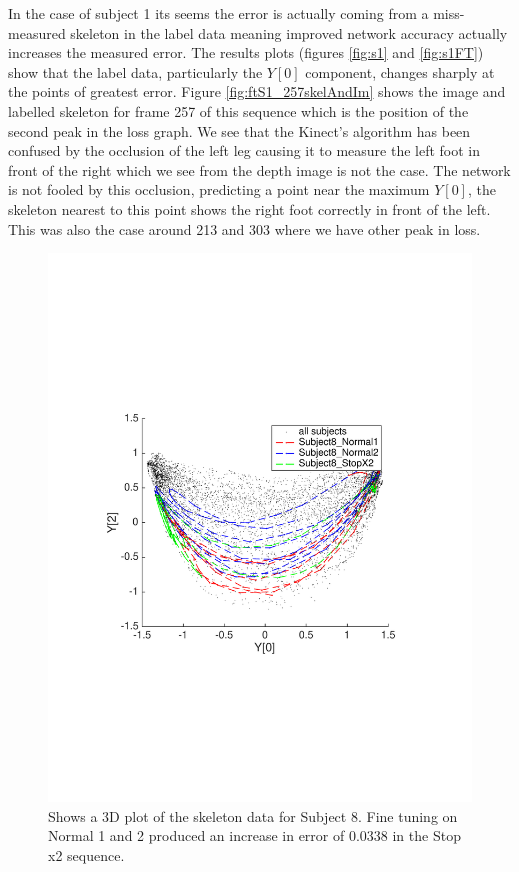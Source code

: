 \documentclass[11pt]{article} %
\begin{document}
In the case of subject 1 its seems the error is actually coming from a miss-measured skeleton in the label data meaning improved network accuracy actually increases the measured error. The results plots (figures \ref{fig:s1} and \ref{fig:s1FT}) show that the label data, particularly the $Y[0]$ component, changes sharply at the points of greatest error. Figure \ref{fig:ftS1_257skelAndIm} shows the image and labelled skeleton for frame 257 of this sequence which is the position of the second peak in the loss graph. We see that the Kinect's algorithm has been confused by the occlusion of the left leg causing it to measure the left foot in front of the right which we see from the depth image is not the case. The network is not fooled by this occlusion, predicting a point near the maximum $Y[0]$, the skeleton nearest to this point shows the right foot correctly in front of the left. This was also the case around 213 and 303 where we have other peak in loss. 

\begin{figure}
\centering
\includegraphics*[width=0.65\linewidth,trim={0.5cm 7.5cm 2.3cm 8.2cm},clip]{finetuning_s8.pdf} 
\caption{Shows a 3D plot of the skeleton data for Subject 8. Fine tuning on Normal 1 and 2 produced an increase in error of 0.0338 in the Stop x2 sequence.}
\label{fig:ftS8}
\end{figure}
\end{document}
